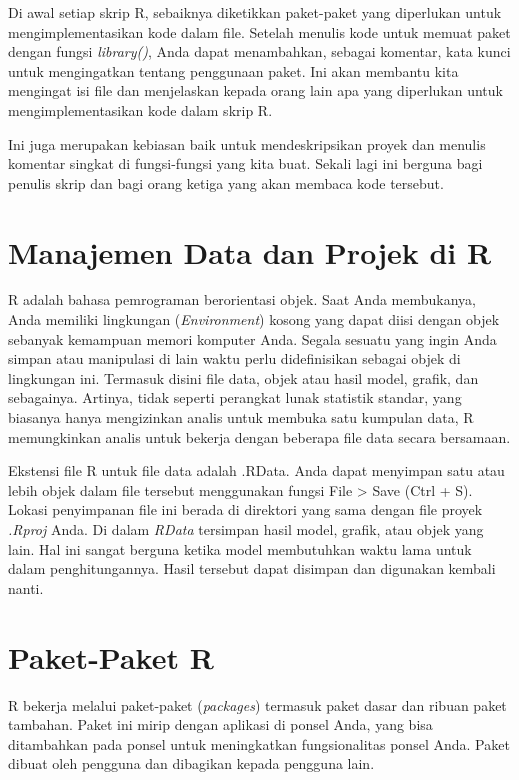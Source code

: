 \documentclass[a4paper, nobind]{templates/ociamthesis}
\begin{document}
Di awal setiap skrip R, sebaiknya diketikkan paket-paket yang diperlukan untuk mengimplementasikan kode dalam file. Setelah menulis kode untuk memuat paket dengan fungsi \emph{library()}, Anda dapat menambahkan, sebagai komentar, kata kunci untuk mengingatkan tentang penggunaan paket. Ini akan membantu kita mengingat isi file dan menjelaskan kepada orang lain apa yang diperlukan untuk mengimplementasikan kode dalam skrip R.

Ini juga merupakan kebiasan baik untuk mendeskripsikan proyek dan menulis komentar singkat di fungsi-fungsi yang kita buat. Sekali lagi ini berguna bagi penulis skrip dan bagi orang ketiga yang akan membaca kode tersebut.

\hypertarget{manajemen-data-dan-projek-di-r}{%
\section{Manajemen Data dan Projek di R}\label{manajemen-data-dan-projek-di-r}}

R adalah bahasa pemrograman berorientasi objek. Saat Anda membukanya, Anda memiliki lingkungan (\emph{Environment}) kosong yang dapat diisi dengan objek sebanyak kemampuan memori komputer Anda. Segala sesuatu yang ingin Anda simpan atau manipulasi di lain waktu perlu didefinisikan sebagai objek di lingkungan ini. Termasuk disini file data, objek atau hasil model, grafik, dan sebagainya. Artinya, tidak seperti perangkat lunak statistik standar, yang biasanya hanya mengizinkan analis untuk membuka satu kumpulan data, R memungkinkan analis untuk bekerja dengan beberapa file data secara bersamaan.

Ekstensi file R untuk file data adalah .RData. Anda dapat menyimpan satu atau lebih objek dalam file tersebut menggunakan fungsi File \textgreater{} Save (Ctrl + S). Lokasi penyimpanan file ini berada di direktori yang sama dengan file proyek \emph{.Rproj} Anda. Di dalam \emph{RData} tersimpan hasil model, grafik, atau objek yang lain. Hal ini sangat berguna ketika model membutuhkan waktu lama untuk dalam penghitungannya. Hasil tersebut dapat disimpan dan digunakan kembali nanti.

\hypertarget{paket-paket-r}{%
\section{Paket-Paket R}\label{paket-paket-r}}

R bekerja melalui paket-paket (\emph{packages}) termasuk paket dasar dan ribuan paket tambahan. Paket ini mirip dengan aplikasi di ponsel Anda, yang bisa ditambahkan pada ponsel untuk meningkatkan fungsionalitas ponsel Anda. Paket dibuat oleh pengguna dan dibagikan kepada pengguna lain.
\end{document}
